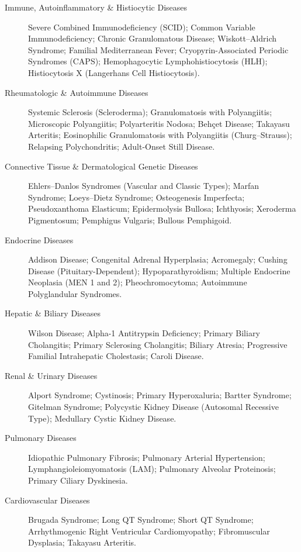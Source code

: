 \begin{description}
\item[Immune, Autoinflammatory \& Histiocytic Diseases] Severe Combined Immunodeficiency (SCID); Common Variable Immunodeficiency; Chronic Granulomatous Disease; Wiskott–Aldrich Syndrome; Familial Mediterranean Fever; Cryopyrin-Associated Periodic Syndromes (CAPS); Hemophagocytic Lymphohistiocytosis (HLH); Histiocytosis X (Langerhans Cell Histiocytosis).

\item[Rheumatologic \& Autoimmune Diseases] Systemic Sclerosis (Scleroderma); Granulomatosis with Polyangiitis; Microscopic Polyangiitis; Polyarteritis Nodosa; Behçet Disease; Takayasu Arteritis; Eosinophilic Granulomatosis with Polyangiitis (Churg–Strauss); Relapsing Polychondritis; Adult-Onset Still Disease.

\item[Connective Tissue \& Dermatological Genetic Diseases] Ehlers–Danlos Syndromes (Vascular and Classic Types); Marfan Syndrome; Loeys–Dietz Syndrome; Osteogenesis Imperfecta; Pseudoxanthoma Elasticum; Epidermolysis Bullosa; Ichthyosis; Xeroderma Pigmentosum; Pemphigus Vulgaris; Bullous Pemphigoid.

\item[Endocrine Diseases] Addison Disease; Congenital Adrenal Hyperplasia; Acromegaly; Cushing Disease (Pituitary-Dependent); Hypoparathyroidism; Multiple Endocrine Neoplasia (MEN 1 and 2); Pheochromocytoma; Autoimmune Polyglandular Syndromes.

\item[Hepatic \& Biliary Diseases] Wilson Disease; Alpha-1 Antitrypsin Deficiency; Primary Biliary Cholangitis; Primary Sclerosing Cholangitis; Biliary Atresia; Progressive Familial Intrahepatic Cholestasis; Caroli Disease.

\item[Renal \& Urinary Diseases] Alport Syndrome; Cystinosis; Primary Hyperoxaluria; Bartter Syndrome; Gitelman Syndrome; Polycystic Kidney Disease (Autosomal Recessive Type); Medullary Cystic Kidney Disease.

\item[Pulmonary Diseases] Idiopathic Pulmonary Fibrosis; Pulmonary Arterial Hypertension; Lymphangioleiomyomatosis (LAM); Pulmonary Alveolar Proteinosis; Primary Ciliary Dyskinesia.

\item[Cardiovascular Diseases] Brugada Syndrome; Long QT Syndrome; Short QT Syndrome; Arrhythmogenic Right Ventricular Cardiomyopathy; Fibromuscular Dysplasia; Takayasu Arteritis.


\end{description}
